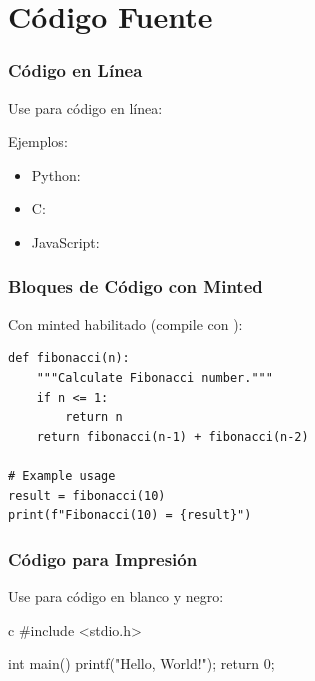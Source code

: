 \documentclass{pt-slides}
\begin{document}
\section{Código Fuente}

\begin{frame}[fragile]
    \frametitle{Código en Línea}

    Use  para código en línea:

    \vspace{0.5cm}

    Ejemplos:
    \begin{itemize}
        \item Python: 
        \item C: 
        \item JavaScript: 
    \end{itemize}
\end{frame}

\begin{frame}[fragile]
    \frametitle{Bloques de Código con Minted}

    Con minted habilitado (compile con ):

    \vspace{0.3cm}

    \begin{verbatim}
def fibonacci(n):
    """Calculate Fibonacci number."""
    if n <= 1:
        return n
    return fibonacci(n-1) + fibonacci(n-2)

# Example usage
result = fibonacci(10)
print(f"Fibonacci(10) = {result}")
    \end{verbatim}
\end{frame}

\begin{frame}[fragile]
    \frametitle{Código para Impresión}

    Use  para código en blanco y negro:

    \vspace{0.3cm}

    \begin{ptprintcode}{c}
        #include <stdio.h>

        int main() {
                printf("Hello, World!\n");
                return 0;
            }
    \end{ptprintcode}
\end{frame}
\end{document}

